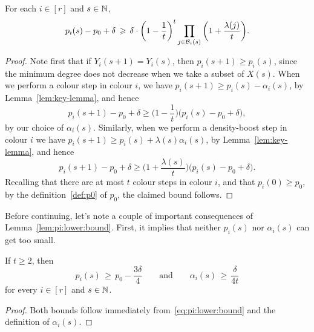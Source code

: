 
\begin{lemma}
  \label{lem:pi:lower:bound} %
  For each \(i \in [r]\) and \(s \in \mathbb{N}\), 
  \begin{equation}\label{eq:pi:lower:bound}
    p_i(s) - p_0 + \delta \, \geqslant \, \delta \cdot \bigg( 1 - \frac{1}{t} \bigg)^{t} \prod_{j \in \mathcal{B}_i(s)} \bigg( 1 + \frac{\lambda(j)}{t} \bigg).
  \end{equation}
\end{lemma}

\begin{proof}
  Note first that if \(Y_i(s+1) = Y_i(s)\), then \(p_i(s+1) \ge p_i(s)\), since the minimum degree does not decrease when we take a subset of \(X(s)\). When we perform a colour step in colour \(i\), %
  we have \(p_i(s+1) \ge p_i(s) - \alpha_i(s)\), by Lemma~\ref{lem:key-lemma}, and hence
  \begin{equation*}
    p_i(s+1) - p_0 + \delta \ge \bigg( 1 - \frac{1}{t} \bigg) \big( p_i(s) - p_0 + \delta \big),
  \end{equation*}
  by our choice of \(\alpha_i(s)\). Similarly, when we perform a density-boost step in colour \(i\)  
  we have \(p_i(s+1) \ge p_i(s) + \lambda(s) \alpha_i(s)\), by Lemma~\ref{lem:key-lemma}, and hence
  \begin{equation*}
    p_i(s+1) - p_0 + \delta \ge \bigg( 1 + \frac{\lambda(s)}{t} \bigg) \big( p_i(s) - p_0 + \delta \big).
  \end{equation*}
  Recalling that there are at most \(t\) colour steps in colour \(i\), and that \(p_i(0) \ge p_0\), by the definition~\eqref{def:p0} of \(p_0\), the claimed bound follows. 
\end{proof}

Before continuing, let's note a couple of important consequences of Lemma~\ref{lem:pi:lower:bound}. First, it implies that neither \(p_i(s)\) nor \(\alpha_i(s)\) can get too small. 

\begin{lemma}
  \label{lem:pi:min} %
  If \(t \ge 2\), then 
  \begin{equation*}
    p_i(s) \, \ge \, p_0 - \frac{3\delta}{4} \qquad \text{and} \qquad \alpha_i(s) \, \ge \, \frac{\delta}{4t}
  \end{equation*}
  for every \(i \in [r]\) and \(s \in \mathbb{N}\). 
\end{lemma}
%
\begin{proof}
  Both bounds follow immediately from~\eqref{eq:pi:lower:bound} and the definition of \(\alpha_i(s)\). 
\end{proof}

